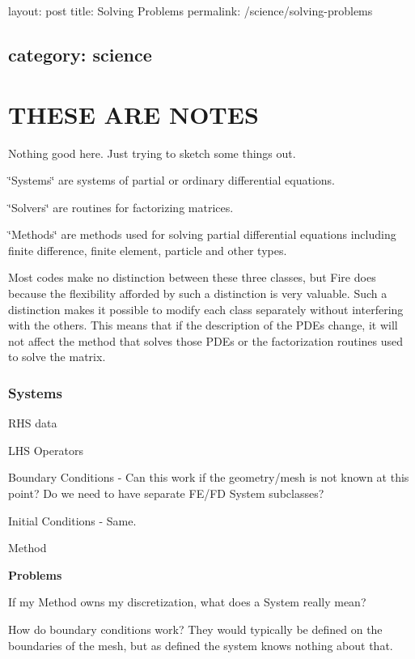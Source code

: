 

 layout\+: post title\+: Solving Problems permalink\+: /science/solving-\/problems \subsection*{category\+: science }

\section*{T\+H\+E\+SE A\+RE N\+O\+T\+ES}

Nothing good here. Just trying to sketch some things out.

\char`\"{}\+Systems\char`\"{} are systems of partial or ordinary differential equations.

\char`\"{}\+Solvers\char`\"{} are routines for factorizing matrices.

\char`\"{}\+Methods\char`\"{} are methods used for solving partial differential equations including finite difference, finite element, particle and other types.

Most codes make no distinction between these three classes, but Fire does because the flexibility afforded by such a distinction is very valuable. Such a distinction makes it possible to modify each class separately without interfering with the others. This means that if the description of the P\+D\+Es change, it will not affect the method that solves those P\+D\+Es or the factorization routines used to solve the matrix.

\subsubsection*{Systems}


\begin{DoxyItemize}
\item R\+HS data
\item L\+HS Operators
\item Boundary Conditions -\/ Can this work if the geometry/mesh is not known at this point? Do we need to have separate F\+E/\+FD System subclasses?
\item Initial Conditions -\/ Same.
\item Method
\end{DoxyItemize}

{\bfseries Problems}


\begin{DoxyItemize}
\item If my Method owns my discretization, what does a System really mean?
\item How do boundary conditions work? They would typically be defined on the boundaries of the mesh, but as defined the system knows nothing about that.
\end{DoxyItemize}

